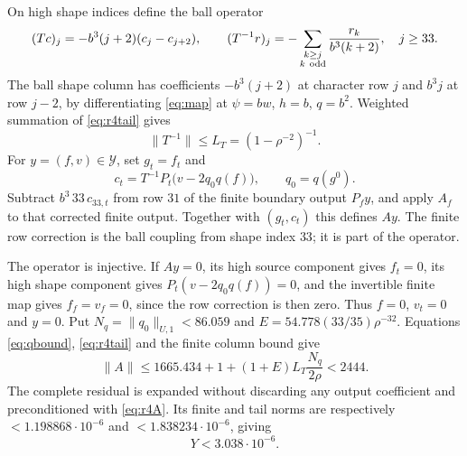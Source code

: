 \documentclass[11pt]{amsart}
\theoremstyle{remark}
\numberwithin{equation}{section}
\newcommand{\norm}[1]{\lVert#1\rVert}
\newcommand{\Pf}{P_f}
\newcommand{\Pt}{P_t}
\begin{document}
On high shape indices define the ball operator
\begin{equation}\label{eq:r4tail}
 (Tc)_j=-b^3(j+2)(c_j-c_{j+2}),\qquad
 (T^{-1}r)_j=-\sum_{\substack{k\ge j\\k\ {\rm odd}}}
                    \frac{r_k}{b^3(k+2)},\quad j\ge33.
\end{equation}
The ball shape column has coefficients $-b^3(j+2)$ at character row $j$
and $b^3j$ at row $j-2$, by differentiating \eqref{eq:map} at
$\psi=bw$, $h=b$, $q=b^2$. Weighted summation of
\eqref{eq:r4tail} gives
\[
 \norm{T^{-1}}\le L_T=(1-\rho^{-2})^{-1}.
\]
For $y=(f,v)\in\mathcal Y$, set $g_t=f_t$ and
\begin{equation}\label{eq:r4A}
 c_t=T^{-1}\Pt\bigl(v-2q_0q(f)\bigr),\qquad q_0=q(g^0).
\end{equation}
Subtract $b^3\,33\,c_{33,t}$ from row $31$ of the finite boundary output
$\Pf y$, and apply $A_f$ to that corrected finite output. Together with
$(g_t,c_t)$ this defines $Ay$. The finite row correction is the ball
coupling from shape index $33$; it is part of the operator.

The operator is injective. If $Ay=0$, its high source component gives
$f_t=0$, its high shape component gives
$\Pt(v-2q_0q(f))=0$, and the invertible finite map gives
$f_f=v_f=0$, since the row correction is then zero. Thus $f=0$, $v_t=0$
and $y=0$.
Put $N_q=\norm{q_0}_{U,1}<86.059$ and
$E=54.778(33/35)\rho^{-32}$. Equations
\eqref{eq:qbound}, \eqref{eq:r4tail} and the finite column bound give
\begin{equation}\label{eq:r4Anorm}
 \norm A\le1665.434+1+(1+E)L_T\frac{N_q}{2\rho}<2444.
\end{equation}
The complete residual is expanded without discarding any output
coefficient and preconditioned with \eqref{eq:r4A}. Its finite and tail
norms are respectively $<1.198868\cdot10^{-6}$ and
$<1.838234\cdot10^{-6}$, giving
\begin{equation}\label{eq:r4Y}
 Y<3.038\cdot10^{-6}.
\end{equation}
\end{document}
